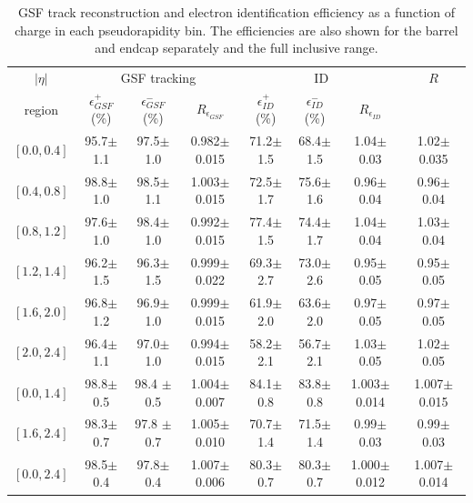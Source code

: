 \begin{table}[htbp]
\begin{center}
\begin{sideways}
\begin{tabular}{cccccccc}
    \toprule
$|\eta|$  & \multicolumn{3}{c}{GSF tracking } & \multicolumn{3}{c}{ID } & $R$ \\
region    & $\epsilon_{GSF}^+$ (\%) &$\epsilon_{GSF}^-$ (\%) & $R_{\epsilon_{GSF}}$ 
                                              & $\epsilon_{ID}^+$ (\%) &$\epsilon_{ID}^-$ (\%) & $R_{\epsilon_{ID}}$ &  \\
\midrule
$\left[ 0.0,0.4 \right]$ & 95.7$\pm$1.1 & 97.5$\pm$1.0 & 0.982$\pm$0.015 & 71.2$\pm$1.5 & 68.4$\pm$1.5 & 1.04$\pm$0.03 &1.02$\pm$0.035  \\
$\left[ 0.4,0.8 \right]$ & 98.8$\pm$ 1.0& 98.5$\pm$1.1 & 1.003$\pm$0.015 & 72.5$\pm$1.7 & 75.6$\pm$1.6 & 0.96$\pm$0.04 &0.96$\pm$ 0.04 \\
$\left[ 0.8,1.2 \right]$ & 97.6$\pm$ 1.0& 98.4$\pm$1.0 & 0.992$\pm$0.015 & 77.4$\pm$1.5 & 74.4$\pm$1.7 & 1.04$\pm$0.04 &1.03$\pm$ 0.04 \\
$\left[ 1.2,1.4 \right]$ & 96.2$\pm$ 1.5& 96.3$\pm$1.5 & 0.999$\pm$0.022 & 69.3$\pm$2.7 & 73.0$\pm$2.6 & 0.95$\pm$0.05 &0.95$\pm$0.05  \\
$\left[ 1.6,2.0 \right]$ & 96.8$\pm$ 1.2& 96.9$\pm$1.0 & 0.999$\pm$0.015 & 61.9$\pm$2.0 & 63.6$\pm$2.0 & 0.97$\pm$0.05 &0.97$\pm$0.05  \\
$\left[ 2.0,2.4 \right]$ & 96.4$\pm$ 1.1& 97.0$\pm$1.0 & 0.994$\pm$0.015 & 58.2$\pm$2.1 & 56.7$\pm$2.1 & 1.03$\pm$0.05 &1.02$\pm$0.05  \\
\midrule
$\left[ 0.0,1.4 \right]$ & 98.8$\pm$0.5 & 98.4 $\pm$0.5 & 1.004$\pm$0.007 & 84.1$\pm$0.8 & 83.8$\pm$0.8 & 1.003$\pm$0.014 & 1.007$\pm$ 0.015 \\
$\left[ 1.6,2.4 \right]$ & 98.3$\pm$0.7 & 97.8 $\pm$0.7 & 1.005$\pm$0.010 & 70.7$\pm$1.4 & 71.5$\pm$1.4 & 0.99$\pm$0.03 &0.99$\pm$ 0.03 \\
\midrule 
$\left[ 0.0,2.4 \right]$ & 98.5$\pm$0.4 & 97.8$\pm$0.4 & 1.007$\pm$0.006 & 80.3$\pm$0.7 & 80.3$\pm$0.7 & 1.000$\pm$0.012 &1.007$\pm$0.014  \\
    \bottomrule
\end{tabular}
\end{sideways}
\end{center}

\caption[GSF track reconstruction and electron identification efficiency as a
function of charge in each pseudorapidity bin.]{GSF track reconstruction and
electron identification efficiency as a function of charge in each
pseudorapidity bin. The efficiencies are also shown for the barrel and endcap
separately and the full inclusive range\cite{baisini2010electron}.}

\label{tab:tagprobe}
\end{table}

